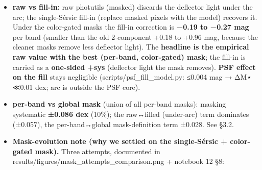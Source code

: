 \documentclass[
]{article}
\newcommand{\BreakablePath}[1]{{\ttfamily\sloppy #1}}
\begin{document}
\begin{itemize}
\begin{itemize}
    expert hand-mask M⋆ (11.33), our calibration that they neither over-
    nor under-mask. (c) The morphology guard assumes the single Sérsic
    captures the deflector majority --- true here (66--87\%); if a
    future target has a worse single-Sérsic fit, re-check that
    \BreakablePath{resid>model} still protects the body.
  \end{itemize}
\item
  \textbf{raw vs fill-in:} raw photutils (masked) discards the deflector
  light under the arc; the single-Sérsic fill-in (replace masked pixels
  with the model) recovers it. Under the color-gated masks the fill-in
  correction is \textbf{−0.19 to −0.27 mag} per band (smaller than the
  old 2-component +0.18 to +0.96 mag, because the cleaner masks remove
  less deflector light). The \textbf{headline is the empirical raw value
  with the best (per-band, color-gated) mask}; the fill-in is carried as
  a \textbf{one-sided +sys} (deflector light the mask removes).
  \textbf{PSF effect on the fill} stays negligible
  (\BreakablePath{scripts/\discretionary{}{}{}psf\_\discretionary{}{}{}fill\_\discretionary{}{}{}model.\discretionary{}{}{}py}:
  ≤0.004 mag → ΔM⋆ ≪0.01 dex; arc is outside the PSF core).
\item
  \textbf{per-band vs global mask} (union of all per-band masks):
  masking systematic \textbf{±0.086 dex} (10\%); the raw↔filled
  (under-arc) term dominates (±0.057), the per-band↔global
  mask-definition term ±0.028. See §3.2.
\item
  \textbf{Mask-evolution note (why we settled on the single-Sérsic +
  color-gated mask).} Three attempts, documented in
  \BreakablePath{results/\discretionary{}{}{}figures/\discretionary{}{}{}mask\_\discretionary{}{}{}attempts\_\discretionary{}{}{}comparison.\discretionary{}{}{}png}
  + notebook 12 §8:


\end{itemize}
\end{document}
